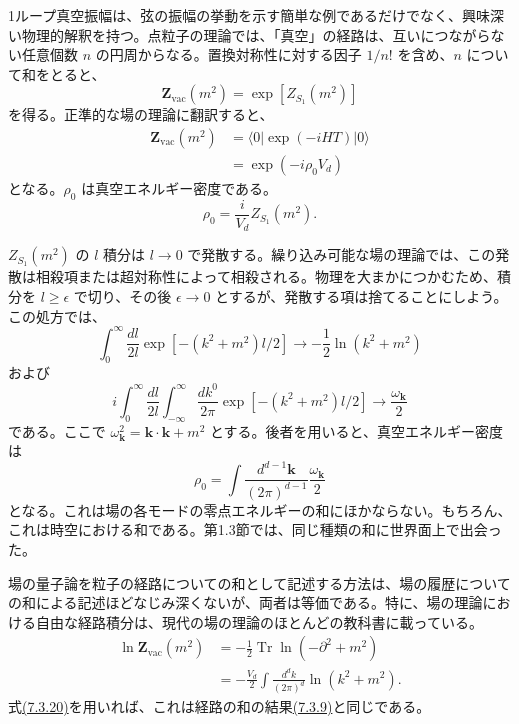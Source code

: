 
1ループ真空振幅は、弦の振幅の挙動を示す簡単な例であるだけでなく、興味深い物理的解釈を持つ。点粒子の理論では、「真空」の経路は、互いにつながらない任意個数 $n$ の円周からなる。置換対称性に対する因子 $1/n!$ を含め、$n$ について和をとると、
\begin{equation}
\mathbf Z_{\mathrm{vac}}(m^2)=\exp[Z_{S_1}(m^2)]
\tag{7.3.17}\label{eq:7.3.17}
\end{equation}
を得る。正準的な場の理論に翻訳すると、
\begin{equation}
\begin{aligned}
\mathbf Z_{\mathrm{vac}}(m^2)
&=\langle0|\exp(-iHT)|0\rangle\\
&=\exp(-i\rho_0V_d)
\end{aligned}
\tag{7.3.18}\label{eq:7.3.18}
\end{equation}
となる。$\rho_0$ は真空エネルギー密度である。
\begin{equation}
\rho_0=\frac i{V_d}Z_{S_1}(m^2).
\tag{7.3.19}\label{eq:7.3.19}
\end{equation}

$Z_{S_1}(m^2)$ の $l$ 積分は $l\to0$ で発散する。繰り込み可能な場の理論では、この発散は相殺項または超対称性によって相殺される。物理を大まかにつかむため、積分を $l\geq\epsilon$ で切り、その後 $\epsilon\to0$ とするが、発散する項は捨てることにしよう。この処方では、
\begin{equation}
\int_0^\infty\frac{dl}{2l}\exp[-(k^2+m^2)l/2]
\longrightarrow-\frac12\ln(k^2+m^2)
\tag{7.3.20}\label{eq:7.3.20}
\end{equation}
および
\begin{equation}
i\int_0^\infty\frac{dl}{2l}
\int_{-\infty}^{\infty}\frac{dk^0}{2\pi}
\exp[-(k^2+m^2)l/2]
\longrightarrow\frac{\omega_{\mathbf k}}2
\tag{7.3.21}\label{eq:7.3.21}
\end{equation}
である。ここで $\omega_{\mathbf k}^2=\mathbf k\cdot\mathbf k+m^2$ とする。後者を用いると、真空エネルギー密度は
\begin{equation}
\rho_0=\int\frac{d^{d-1}\mathbf k}{(2\pi)^{d-1}}
\frac{\omega_{\mathbf k}}2
\tag{7.3.22}\label{eq:7.3.22}
\end{equation}
となる。これは場の各モードの零点エネルギーの和にほかならない。もちろん、これは時空における和である。第1.3節では、同じ種類の和に世界面上で出会った。

場の量子論を粒子の経路についての和として記述する方法は、場の履歴についての和による記述ほどなじみ深くないが、両者は等価である。特に、場の理論における自由な経路積分は、現代の場の理論のほとんどの教科書に載っている。
\begin{equation}
\begin{aligned}
\ln\mathbf Z_{\mathrm{vac}}(m^2)
&=-\frac12\operatorname{Tr}\ln(-\partial^2+m^2)\\
&=-\frac{V_d}{2}\int\frac{d^dk}{(2\pi)^d}\ln(k^2+m^2).
\end{aligned}
\tag{7.3.23}\label{eq:7.3.23}
\end{equation}
式\hyperref[eq:7.3.20]{(7.3.20)}を用いれば、これは経路の和の結果\hyperref[eq:7.3.9]{(7.3.9)}と同じである。


